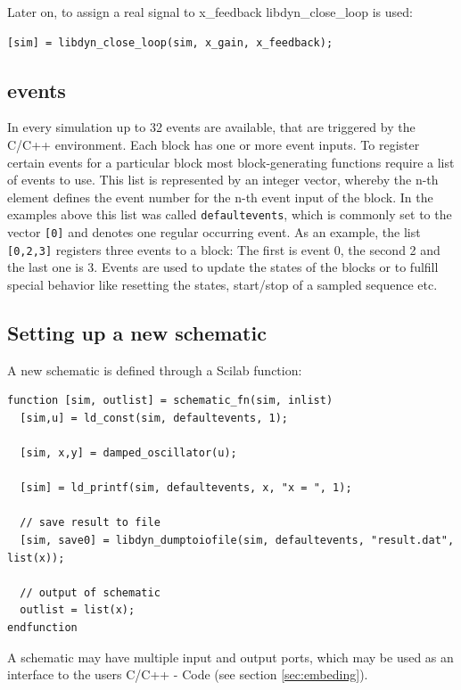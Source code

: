 \documentclass[%
	pdftex,%
	a4paper,%
	oneside,%
	11pt,%
	halfparskip,%
	headsepline,%
	bibtotocnumbered,%
	idxtotoc%
]{scrartcl}
\begin{document}
Later on, to assign a real signal to x\_feedback libdyn\_close\_loop is used:

\begin{verbatim}
[sim] = libdyn_close_loop(sim, x_gain, x_feedback);
\end{verbatim}

\subsection{events}

In every simulation up to 32 events are available, that are triggered by the C/C++ environment. Each block has one or more event inputs. To register certain events for a particular block most block-generating functions require a list of events to use. This list is represented by an integer vector, whereby the n-th element defines the event number for the n-th event input of the block. In the examples above this list was called \texttt{defaultevents}, which is commonly set to the vector \texttt{[0]} and denotes one regular occurring event. As an example, the list \texttt{[0,2,3]} registers three events to a block: The first is event 0, the second 2 and the last one is 3.
Events are used to update the states of the blocks or to fulfill special behavior like resetting the states, start/stop of a sampled sequence etc.

\subsection{Setting up a new schematic}

A new schematic is defined through a Scilab function:

\begin{verbatim}
function [sim, outlist] = schematic_fn(sim, inlist)
  [sim,u] = ld_const(sim, defaultevents, 1);
  
  [sim, x,y] = damped_oscillator(u);
  
  [sim] = ld_printf(sim, defaultevents, x, "x = ", 1);
  
  // save result to file
  [sim, save0] = libdyn_dumptoiofile(sim, defaultevents, "result.dat", list(x));
  
  // output of schematic
  outlist = list(x);
endfunction
\end{verbatim}

A schematic may have multiple input and output ports, which may be used as an interface to the users C/C++ - Code (see section \ref{sec:embeding}).
\end{document}
